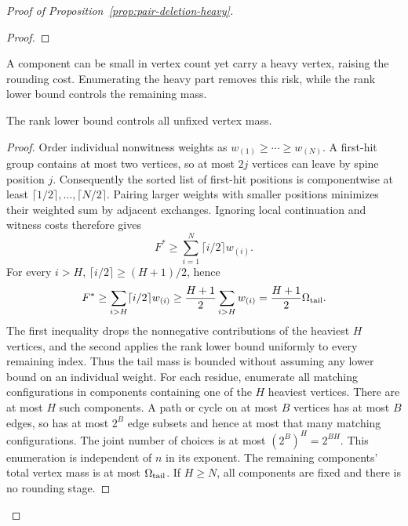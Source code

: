 \begin{proof}[Proof of Proposition~\ref{prop:pair-deletion-heavy}]
\begin{proof}
\end{proof}
A component can be small in vertex count yet carry a heavy vertex,
raising the rounding cost. Enumerating the heavy part removes this
risk, while the rank lower bound controls the remaining mass.

\begin{claim}
\label{clm:pair-heavy-tail}
The rank lower bound controls all unfixed vertex mass.
\end{claim}
\begin{proof}
Order individual nonwitness weights as $w_{(1)}\ge\cdots\ge w_{(N)}$.
A first-hit group contains at most two vertices, so at most $2j$
vertices can leave by spine position $j$. Consequently the sorted
list of first-hit positions is componentwise at least
$\lceil1/2\rceil,\ldots,\lceil N/2\rceil$.
Pairing larger weights with smaller positions minimizes their weighted
sum by adjacent exchanges. Ignoring local continuation and witness
costs therefore gives
\[
 F^*\ge\sum_{i=1}^N\lceil i/2\rceil w_{(i)}.
\]
For every $i>H$, $\lceil i/2\rceil\ge(H+1)/2$, hence
\[
 F^*\ge\sum_{i>H}\lceil i/2\rceil w_{(i)}
 \ge\frac{H+1}{2}\sum_{i>H}w_{(i)}
 =\frac{H+1}{2}\Omega_{\rm tail}.
\]
The first inequality drops the nonnegative contributions of the
heaviest $H$ vertices, and the second applies the rank lower bound
uniformly to every remaining index. Thus the tail mass is bounded
without assuming any lower bound on an individual weight.
For each residue, enumerate all matching configurations in components
containing one of the $H$ heaviest vertices. There are at most $H$
such components. A path or cycle on at most $B$ vertices has at most
$B$ edges, so has at most $2^B$ edge subsets and hence at most that
many matching configurations. The joint number of choices is at most
$(2^B)^H=2^{BH}$. This enumeration
is independent of $n$ in its exponent. The remaining components'
total vertex mass is at most $\Omega_{\rm tail}$. If $H\ge N$,
all components are fixed and there is no rounding stage.

\end{proof}
\end{proof}

